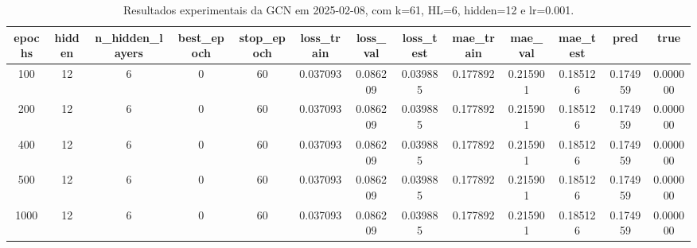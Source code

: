 \begin{table}[h]
\centering
\caption{Resultados experimentais da GCN em 2025-02-08, com k=61, HL=6, hidden=12 e lr=0.001.}
\label{tab:gcn_results_k61_hl6_h12_d20250208}
\begin{tabular}{ccccccccccccc}
\toprule
epochs & hidden & n\_hidden\_layers & best\_epoch & stop\_epoch & loss\_train & loss\_val & loss\_test & mae\_train & mae\_val & mae\_test & pred & true \\
\midrule
100 & 12 & 6 & 0 & 60 & 0.037093 & 0.086209 & 0.039885 & 0.177892 & 0.215901 & 0.185126 & 0.174959 & 0.000000 \\
200 & 12 & 6 & 0 & 60 & 0.037093 & 0.086209 & 0.039885 & 0.177892 & 0.215901 & 0.185126 & 0.174959 & 0.000000 \\
400 & 12 & 6 & 0 & 60 & 0.037093 & 0.086209 & 0.039885 & 0.177892 & 0.215901 & 0.185126 & 0.174959 & 0.000000 \\
500 & 12 & 6 & 0 & 60 & 0.037093 & 0.086209 & 0.039885 & 0.177892 & 0.215901 & 0.185126 & 0.174959 & 0.000000 \\
1000 & 12 & 6 & 0 & 60 & 0.037093 & 0.086209 & 0.039885 & 0.177892 & 0.215901 & 0.185126 & 0.174959 & 0.000000 \\
\bottomrule
\end{tabular}
\end{table}
